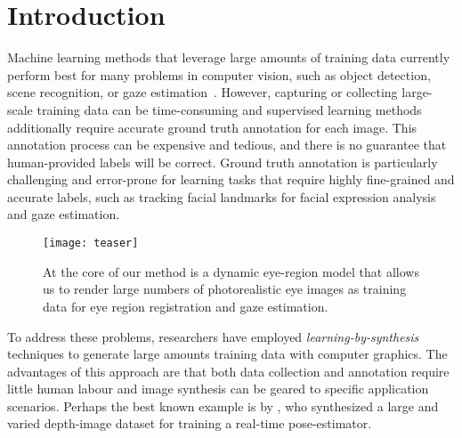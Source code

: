 
\section{Introduction}



Machine learning methods that leverage large amounts of training data currently perform best for many problems in computer vision, such as object detection, scene recognition, or gaze estimation~\cite{zhou2014learning,girshick2014rich,zhang15_cvpr}.
However, capturing or collecting large-scale training data can be time-consuming
and supervised learning methods additionally require accurate ground truth annotation for each image.
This annotation process can be expensive and tedious, and there is no guarantee that human-provided labels will be correct.
Ground truth annotation is particularly challenging and error-prone for learning tasks that require highly fine-grained and accurate labels, such as tracking facial landmarks for facial expression analysis and gaze estimation.

\begin{figure}
    \texttt{[image: teaser]}
    \caption{At the core of our method is a dynamic eye-region model that allows us to render large numbers of photorealistic eye images as training data for eye region registration and gaze estimation.}
    \label{fig:teaser}
\end{figure}

To address these problems, researchers have employed \emph{learning-by-synthesis} techniques to generate large amounts training data with computer graphics.
The advantages of this approach are that both data collection and annotation require little human labour and image synthesis can be geared to specific application scenarios.
Perhaps the best known example is by \citet{shotton2013real}, who synthesized a large and varied depth-image dataset for training a real-time pose-estimator.

